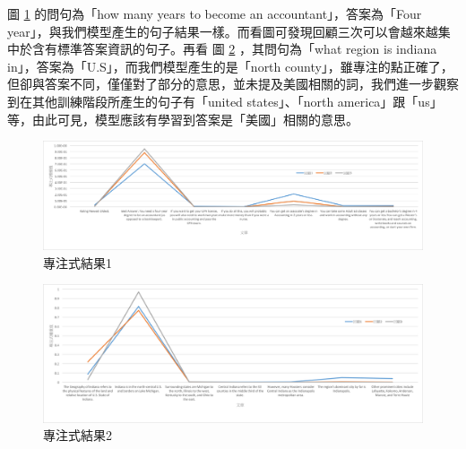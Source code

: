 圖 \ref{fig:attn_1} 的問句為「how many years to become an accountant」，答案為「Four year」，與我們模型產生的句子結果一樣。而看圖可發現回顧三次可以會越來越集中於含有標準答案資訊的句子。再看
圖 \ref{fig:attn_2} ，其問句為「what region is indiana in」，答案為「U.S」，而我們模型產生的是「north county」，雖專注的點正確了，但卻與答案不同，僅僅對了部分的意思，並未提及美國相關的詞，我們進一步觀察到在其他訓練階段所產生的句子有「united states」、「north america」跟「us」等，由此可見，模型應該有學習到答案是「美國」相關的意思。
\begin{figure}
    \centering
    \includegraphics[scale=0.6,angle=90]{images/chap3_attn1.png}
    \caption{專注式結果1}\label{fig:attn_1}
\end{figure}
\begin{figure}
    \centering
    \includegraphics[scale=0.65,angle=90]{images/chap3_attn2.png}
    \caption{專注式結果2}\label{fig:attn_2}
\end{figure}

